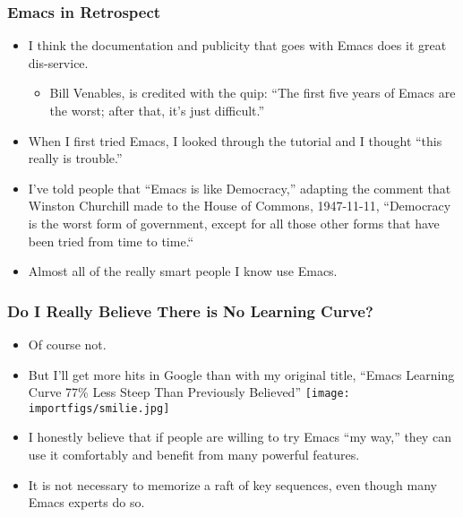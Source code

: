 \documentclass[11pt,english]{beamer}
\begin{document}
\begin{frame}
  \frametitle{Emacs in Retrospect}
  \begin{itemize}
  \item I think the documentation and publicity that goes with Emacs does
    it great dis-service. 

    \begin{itemize}
    \item Bill Venables, is credited with the quip: ``The first five years
      of Emacs are the worst; after that, it's just difficult.''
    \end{itemize}
  \item When I first tried Emacs, I looked through the tutorial and I thought
    ``this really is trouble.'' 
  \item I've told people that ``Emacs is like Democracy,'' adapting the
    comment that Winston Churchill made to the House of Commons, 1947-11-11,
    ``Democracy is the worst form of government, except for all those
    other forms that have been tried from time to time.``
  \item Almost all of the really smart people I know use Emacs.
  \end{itemize}
\end{frame}

\begin{frame}
  \frametitle{Do I Really Believe There is No Learning Curve?}
  \begin{itemize}
  \item Of course not. 
  \item But I'll get more hits in Google than with my original title, ``Emacs
    Learning Curve 77\% Less Steep Than Previously Believed'' \texttt{[image: importfigs/smilie.jpg]}
  \item I honestly believe that if people are willing to try Emacs ``my way,''
    they can use it comfortably and benefit from many powerful features. 
  \item It is not necessary to memorize a raft of key sequences, even though
    many Emacs experts do so.
  \end{itemize}
\end{frame}
\end{document}
